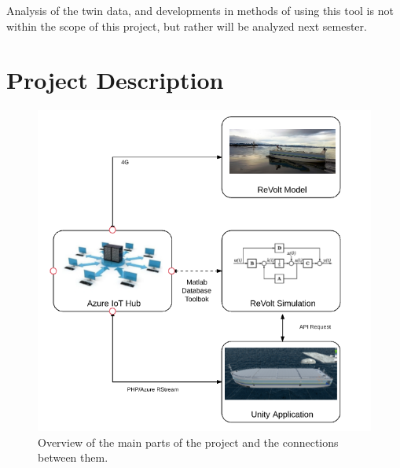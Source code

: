 Analysis of the twin data, and developments in methods of using this tool is not within the scope of this project, but rather will be analyzed next semester.

\section{Project Description}
\begin{figure}[H]
\centering
\includegraphics[scale=1.0]{Images/ProjectDescription.png}
\caption{Overview of the main parts of the project and the connections between them.}
\label{fig:ProjectDescription}
\end{figure}

